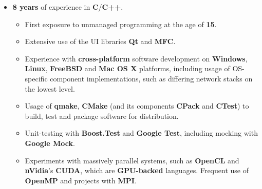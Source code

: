 \documentclass[11pt,a4paper,sans]{moderncv}
\begin{document}
	\vspace{7pt}

	\begin{itemize}
	\item	\label{softdevcpp}  \textbf{8 years} of experience in \textbf{C}/\textbf{C++}.
		\begin{itemize}
		\item	First exposure to unmanaged programming at the age of \textbf{15}.
		\item	Extensive use of the UI libraries \textbf{Qt} and \textbf{MFC}.
		\item	Experience with \textbf{cross-platform} software development on \textbf{Windows}, \textbf{Linux}, \textbf{FreeBSD} and \textbf{Mac OS X} platforms, including usage of OS-specific component implementations, such as differing network stacks on the lowest level.
		\item	Usage of \textbf{qmake}, \textbf{CMake} (and its components \textbf{CPack} and \textbf{CTest}) to build, test and package software for distribution.
		\item	Unit-testing with \textbf{Boost.Test} and \textbf{Google Test}, including mocking with \textbf{Google Mock}.
		\item	Experiments with massively parallel systems, such as \textbf{OpenCL} and \textbf{nVidia}'s \textbf{CUDA}, which are \textbf{GPU-backed} languages. Frequent use of \textbf{OpenMP} and projects with \textbf{MPI}.
		\end{itemize}
	\end{itemize}

	\vspace{7pt}
\end{document}
